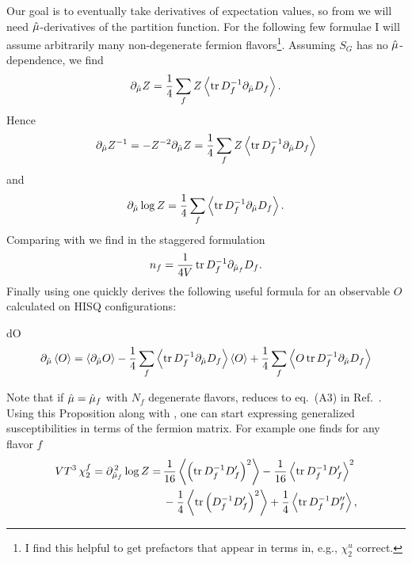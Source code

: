 Our goal is to eventually take derivatives of expectation values, so from
 we will need $\hat{\mu}$-derivatives of the partition 
function. For the following few formulae 
I will assume arbitrarily many non-degenerate
fermion flavors\footnote{I find this helpful to get prefactors that appear
in terms in, e.g., $\chi_2^u$ correct.}. Assuming $S_G$ has no 
$\hat{\mu}$-dependence, we find
\begin{equation}
  \partial_{\muh}Z = \frac{1}{4}\sum_f 
                      Z\ev{\tr D_f^{-1}\partial_{\muh}D_f}.
\end{equation}
Hence 
\begin{equation}\label{eq:dZinv}
  \partial_{\muh}Z^{-1} = -Z^{-2}\partial_{\muh}Z
                        =\frac{1}{4}\sum_fZ\ev{\tr D_f^{-1}\partial_{\muh}D_f}
\end{equation}
and
\begin{equation}\label{eq:dlogZ}
  \partial_{\muh}\log Z=\frac{1}{4}\sum_f\ev{\tr D_f^{-1}\partial_{\muh}D_f}.
\end{equation}
Comparing  with  we find in
the staggered formulation
\begin{equation}
  n_f=\frac{1}{4V}\tr D_f^{-1}\partial_{\hat{\mu}_f}D_f.
\end{equation} 
Finally using  one quickly derives the following useful formula
for an observable $O$ calculated on HISQ configurations:
\begin{proposition}{}{dO}
\begin{equation*} \partial_{\muh}\ev{O}
       =   \ev{\partial_{\muh}O}
        -\frac{1}{4}\sum_f\ev{\tr D_f^{-1}\partial_{\muh}D_f}\ev{O}
         +\frac{1}{4}\sum_f\ev{O\tr D_f^{-1}\partial_{\muh}D_f}
\end{equation*}
\end{proposition} 
Note that if $\hat{\mu}=\hat{\mu}_f$ with $N_f$ degenerate flavors, 
 reduces to eq.~(A3)
in Ref.~\cite{allton_thermodynamics_2005}. Using this Proposition along
with , one 
can start expressing generalized susceptibilities in terms of the fermion
matrix. For example one finds for any flavor $f$
\begin{equation}\begin{aligned}
  VT^3\,\chi_2^f =\partial_{\muh_f}^{\,2}\log Z
                 =\, & \frac{1}{16}\ev{\left(\tr D_f^{-1}D_f'\right)^2}
                    -\frac{1}{16}\ev{\tr D_f^{-1}D_f'}^2\\
                   & -\frac{1}{4}\ev{\tr \left(D_f^{-1} D_f'\right)^2}
                    +\frac{1}{4}\ev{\tr D_f^{-1}D_f''},
\end{aligned}\end{equation}
